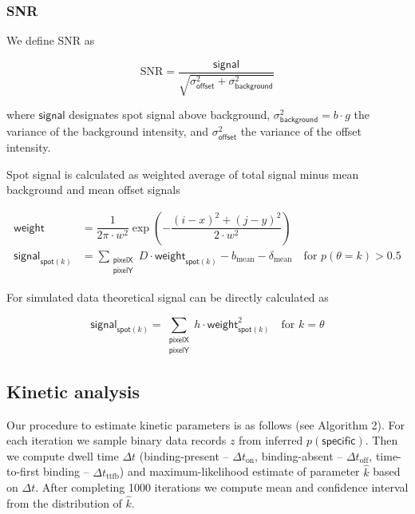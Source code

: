 \subsubsection*{SNR}

We define SNR as

\begin{equation}
    \mathrm{SNR} = \dfrac{\mathsf{signal}}{\sqrt{\sigma^2_{\mathsf{offset}} + \sigma^2_{\mathsf{background}}}}
\end{equation}

where $\mathsf{signal}$ designates spot signal above background, $\sigma^2_{\mathsf{background}} = b \cdot g$ the variance of the background intensity, and $\sigma^2_{\mathsf{offset}}$ the variance of the offset intensity.

Spot signal is calculated as weighted average of total signal minus mean background and mean offset signals

\begin{subequations}
\begin{align}
    \mathsf{weight} &= \dfrac{1}{2 \pi \cdot w^2} \exp{\left( -\dfrac{(i-x)^2 + (j-y)^2}{2 \cdot w^2} \right)} \\
    \mathsf{signal}_{\mathsf{spot}(k)} &=  \sum_{\substack{\mathsf{pixelX} \\ \mathsf{pixelY}}} D \cdot \mathsf{weight}_{\mathsf{spot}(k)} - b_{\mathrm{mean}} - \delta_\mathrm{mean} \quad \textrm{for } p(\theta = k) > 0.5
\end{align}
\end{subequations}

For simulated data theoretical signal can be directly calculated as

\begin{equation}
    \mathsf{signal}_{\mathsf{spot}(k)} =  \sum_{\substack{\mathsf{pixelX} \\ \mathsf{pixelY}}} h \cdot \mathsf{weight}_{\mathsf{spot}(k)}^2 \quad \textrm{for } k = \theta
\end{equation}

\subsection*{Kinetic analysis}

Our procedure to estimate kinetic parameters is as follows (see Algorithm 2). For each iteration we sample binary data records $z$ from inferred $p(\mathsf{specific})$. Then we compute dwell time $\Delta t$ (binding-present -- $\Delta t_\mathrm{on}$, binding-absent -- $\Delta t_\mathrm{off}$, time-to-first binding -- $\Delta t_\mathrm{ttfb}$) and maximum-likelihood estimate of parameter $\hat{k}$ based on $\Delta t$. After completing 1000 iterations we compute mean and confidence interval from the distribution of $\hat{k}$.

